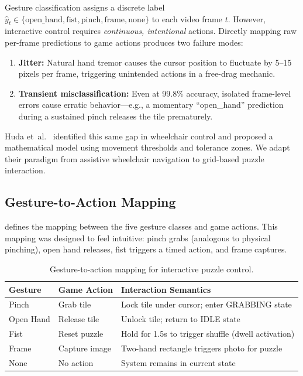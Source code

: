 \documentclass[11pt,a4paper]{article}
\begin{document}
Gesture classification assigns a discrete label $\hat{y}_t \in \{\text{open\_hand}, \text{fist}, \text{pinch}, \text{frame}, \text{none}\}$ to each video frame $t$. However, interactive control requires \textit{continuous, intentional} actions. Directly mapping raw per-frame predictions to game actions produces two failure modes:
\begin{enumerate}
    \item \textbf{Jitter:} Natural hand tremor causes the cursor position to fluctuate by 5--15 pixels per frame, triggering unintended actions in a free-drag mechanic.
    \item \textbf{Transient misclassification:} Even at 99.8\% accuracy, isolated frame-level errors cause erratic behavior---e.g., a momentary ``open\_hand'' prediction during a sustained pinch releases the tile prematurely.
\end{enumerate}

Huda et~al.~\citep{huda2025wheelchair} identified this same gap in wheelchair control and proposed a mathematical model using movement thresholds and tolerance zones. We adapt their paradigm from assistive wheelchair navigation to grid-based puzzle interaction.

\subsection{Gesture-to-Action Mapping}

 defines the mapping between the five gesture classes and game actions. This mapping was designed to feel intuitive: pinch grabs (analogous to physical pinching), open hand releases, fist triggers a timed action, and frame captures.

\begin{table}[htbp]
\centering
\caption{Gesture-to-action mapping for interactive puzzle control.}
\label{tab:gesture_actions}
\begin{tabular}{@{}llp{6cm}@{}}
\toprule
\textbf{Gesture} & \textbf{Game Action} & \textbf{Interaction Semantics} \\
\midrule
Pinch     & Grab tile   & Lock tile under cursor; enter GRABBING state \\
Open Hand & Release tile & Unlock tile; return to IDLE state \\
Fist      & Reset puzzle & Hold for 1.5s to trigger shuffle (dwell activation) \\
Frame     & Capture image & Two-hand rectangle triggers photo for puzzle \\
None      & No action   & System remains in current state \\
\bottomrule
\end{tabular}
\end{table}
\end{document}
